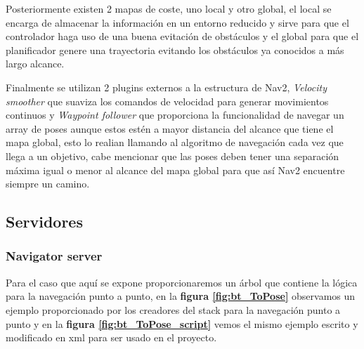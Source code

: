 Posteriormente existen 2 mapas de coste, uno local y otro global, el local se encarga de almacenar la información en un entorno reducido y sirve 
para que el controlador haga uso de una buena evitación de obstáculos  y el global para que el planificador genere una trayectoria evitando los obstáculos ya conocidos a más largo alcance.

Finalmente se utilizan 2 plugins externos a la estructura de Nav2, \textit{Velocity smoother} que suaviza los comandos de velocidad para generar movimientos continuos y 
\textit{Waypoint follower} que proporciona la funcionalidad de navegar un array de poses aunque estos estén a mayor distancia del alcance que tiene 
el mapa global, esto lo realian llamando al algoritmo de navegación cada vez que llega a un objetivo, cabe mencionar que las poses deben tener una separación máxima igual o menor al 
alcance del mapa global para que así Nav2 encuentre siempre un camino.


\subsection{Servidores}
\subsubsection{Navigator server}
Para el caso que aquí se expone proporcionaremos un árbol que contiene la lógica para la navegación punto a punto, en la \textbf{figura \ref{fig:bt_ToPose}} observamos un ejemplo proporcionado por 
los creadores del stack para la navegación punto a punto y en la \textbf{figura \ref{fig:bt_ToPose_script}} vemos el mismo ejemplo escrito y modificado en xml para ser usado en 
el proyecto.


